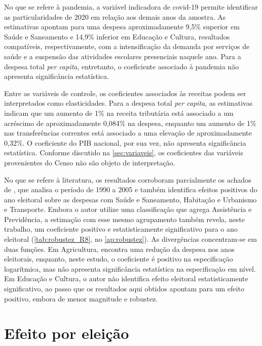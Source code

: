 No que se refere à pandemia, a variável indicadora de covid-19 permite identificar as particularidades de 2020 em relação aos demais anos da amostra. As estimativas apontam para uma despesa aproximadamente 9,5\% superior em Saúde e Saneamento e 14,9\% inferior em Educação e Cultura, resultados compatíveis, respectivamente, com a intensificação da demanda por serviços de saúde e a suspensão das atividades escolares presenciais naquele ano. Para a despesa total \textit{per capita}, entretanto, o coeficiente associado à pandemia não apresenta significância estatística.

Entre as variáveis de controle, os coeficientes associados às receitas podem ser interpretados como elasticidades. Para a despesa total \textit{per capita}, as estimativas indicam que um aumento de 1\% na receita tributária está associado a um acréscimo de aproximadamente 0,084\% na despesa, enquanto um aumento de 1\% nas transferências correntes está associado a uma elevação de aproximadamente 0,32\%. O coeficiente do PIB nacional, por sua vez, não apresenta significância estatística. Conforme discutido na \autoref{sec:variaveis}, os coeficientes das variáveis provenientes do Censo não são objeto de interpretação.

No que se refere à literatura, os resultados corroboram parcialmente os achados de \textcite{sakurai2009}, que analisa o período de 1990 a 2005 e também identifica efeitos positivos do ano eleitoral sobre as despesas com Saúde e Saneamento, Habitação e Urbanismo e Transporte. Embora o autor utilize uma classificação que agrega Assistência e Previdência, a estimação com esse mesmo agrupamento também revela, neste trabalho, um coeficiente positivo e estatisticamente significativo para o ano eleitoral (\autoref{tab:robustez_R8}, no \autoref{ap:robustez}). As divergências concentram-se em duas funções. Em Agricultura, \textcite{sakurai2009} encontra uma redução da despesa nos anos eleitorais, enquanto, neste estudo, o coeficiente é positivo na especificação logarítmica, mas não apresenta significância estatística na especificação em nível. Em Educação e Cultura, o autor não identifica efeito eleitoral estatisticamente significativo, ao passo que os resultados aqui obtidos apontam para um efeito positivo, embora de menor magnitude e robustez.



\section{Efeito por eleição}\label{sec:res_por_eleicao}

